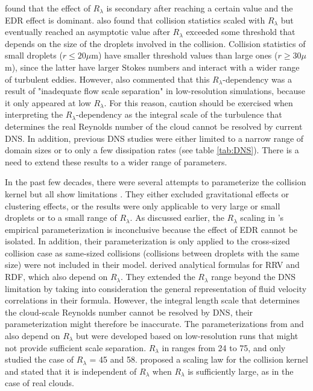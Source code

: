 \citet{Ayala2008a} found that the effect of $R_\lambda$ is secondary after reaching a certain value and the EDR effect is dominant. \citet{Rosa2012, Rosa2013} also found that collision statistics scaled with $R_\lambda$ but eventually reached an asymptotic value after $R_\lambda$ exceeded some threshold that depends on the size of the droplets involved in the collision. Collision statistics of small droplets ($r \leq 20 \mu$m) have smaller threshold values than large ones ($r \geq 30 \mu$m), since the latter have larger Stokes numbers and interact with a wider range of turbulent eddies.  However, \citet{Rosa2012} also commented that this $R_\lambda$-dependency was a result of "inadequate flow scale separation" in low-resolution simulations, because it only appeared at low $R_\lambda$. For this reason, caution should be exercised when interpreting the $R_\lambda$-dependency as the integral scale of the turbulence that determines the real Reynolds number of the cloud cannot be resolved by current DNS. In addition, previous DNS studies were either limited to a narrow range of domain sizes or to only a few dissipation rates (see table \ref{tab:DNS}). There is a need to extend these results to a wider range of parameters.

In the past few decades, there were several attempts to parameterize  the collision kernel but all show limitations \citep[see summary by][]{Ayala2008b}. They either excluded gravitational effects or clustering effects, or the results were only applicable to very large or small droplets or to a small range of $R_\lambda$. As discussed earlier, the $R_\lambda$ scaling in \citet{Franklin2007}'s empirical parameterization is inconclusive because the effect of EDR cannot be isolated. In addition, their parameterization is only applied to the cross-sized collision case as same-sized collisions (collisions between droplets with the same size) were not included in their model. \citet{Ayala2008b} derived analytical formulas for RRV and RDF, which also depend on $R_\lambda$. They extended the $R_\lambda$ range beyond the DNS limitation by taking into consideration the general representation of fluid velocity correlations in their formula. However, the integral length scale that determines the cloud-scale Reynolds number cannot be resolved by DNS, their parameterization might therefore be inaccurate. The parameterizations from \citet{Wang2000} and \citet{Zhou2001} also depend on $R_\lambda$ but were developed based on low-resolution runs that might not provide sufficient scale separation. $R_\lambda$ in \citet{Wang2000} ranges from 24 to 75, and \citet{Zhou2001} only studied the case of $R_\lambda$ = 45 and 58. \citet{Wang1998b} proposed a scaling law for the collision kernel and stated that it is independent of $R_\lambda$ when $R_\lambda$ is sufficiently large, as in the case of real clouds. 

